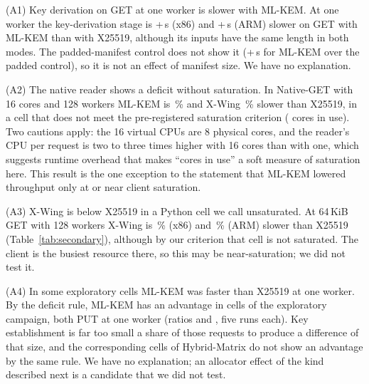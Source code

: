 \documentclass[review,12pt]{elsarticle}
\newcommand{\lab}[1]{\textsf{#1}}
\begin{document}
(A1) Key derivation on GET at one worker is slower with ML-KEM. At one worker the key-derivation stage is
+\RevGetStageKdfDelta\,\textmu s (x86) and +\ArmGetStageKdfDelta\,\textmu s (ARM) slower on GET
with ML-KEM than with X25519, although its inputs have the same length in both modes. The
padded-manifest control does not show it (+\AudKdfOverPadGet\,\textmu s for ML-KEM over the
padded control), so it is not an effect of manifest size. We have no explanation.

(A2) The native reader shows a deficit without saturation. In \lab{Native-GET} with 16 cores and 128
workers ML-KEM is \AudNMidMlkemDeficit\,\% and X-Wing \AudNMidXwingDeficit\,\% slower than
X25519, in a cell that does not meet the pre-registered saturation criterion
(\AudNMidCores{} cores in use). Two cautions apply: the 16 virtual CPUs are 8 physical cores, and
the reader's CPU per request is two to three times higher with 16 cores than with one, which
suggests runtime overhead that makes ``cores in use'' a soft measure of saturation here. This
result is the one exception to the statement that ML-KEM lowered throughput only at or near
client saturation.

(A3) X-Wing is below X25519 in a Python cell we call unsaturated. At 64\,KiB GET with 128
workers X-Wing is \RevXwingMidDeficit\,\% (x86) and \ArmXwingMidDeficit\,\% (ARM) slower than
X25519 (Table~\ref{tab:secondary}), although by our criterion that cell is not saturated. The
client is the busiest resource there, so this may be near-saturation; we did not test it.

(A4) In some exploratory cells ML-KEM was faster than X25519 at one worker. By the deficit rule, ML-KEM has an
advantage in \AudSweepAdvantages{} cells of the exploratory campaign, both PUT at one worker
(ratios \AudSweepAdvantageLo{} and \AudSweepAdvantageHi, five runs each). Key establishment is
far too small a share of those requests to produce a difference of that size, and the
corresponding cells of \lab{Hybrid-Matrix} do not show an advantage by the same rule. We have
no explanation; an allocator effect of the kind described next is a candidate that we did not
test.
\end{document}
